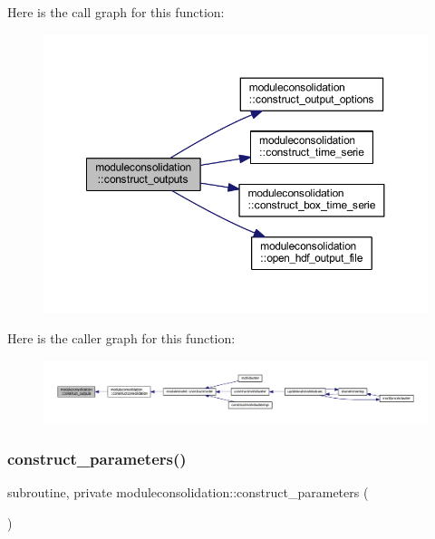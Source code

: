 Here is the call graph for this function\+:\nopagebreak
\begin{figure}[H]
\begin{center}
\leavevmode
\includegraphics[width=350pt]{namespacemoduleconsolidation_a1c6db66f62288736bfc6a93bb76fb12c_cgraph}
\end{center}
\end{figure}
Here is the caller graph for this function\+:\nopagebreak
\begin{figure}[H]
\begin{center}
\leavevmode
\includegraphics[width=350pt]{namespacemoduleconsolidation_a1c6db66f62288736bfc6a93bb76fb12c_icgraph}
\end{center}
\end{figure}
\mbox{\label{namespacemoduleconsolidation_a4699e64424e9e130e7f46758181721ec}} 
\subsubsection{\texorpdfstring{construct\+\_\+parameters()}{construct\_parameters()}}
{\footnotesize\ttfamily subroutine, private moduleconsolidation\+::construct\+\_\+parameters (\begin{DoxyParamCaption}{ }\end{DoxyParamCaption})\hspace{0.3cm}{\ttfamily [private]}}

